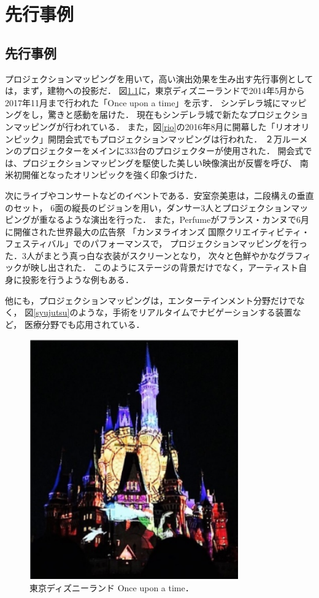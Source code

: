 \chapter{先行事例}
\thispagestyle{fancy}

\section{先行事例}
プロジェクションマッピングを用いて，高い演出効果を生み出す先行事例としては，まず，建物への投影だ．
図\ref{disney}に，東京ディズニーランドで2014年5月から2017年11月まで行われた「Once upon a time」を示す．
シンデレラ城にマッピングをし，驚きと感動を届けた．
現在もシンデレラ城で新たなプロジェクションマッピングが行われている\cite{once}．
また，図\ref{rio}の2016年8月に開幕した「リオオリンピック」開閉会式でもプロジェクションマッピングは行われた． 
２万ルーメンのプロジェクターをメインに333台のプロジェクターが使用された．
開会式では、プロジェクションマッピングを駆使した美しい映像演出が反響を呼び、
南米初開催となったオリンピックを強く印象づけた\cite{olympic}．

次にライブやコンサートなどのイベントである．安室奈美恵は，二段構えの垂直のセット，
6面の縦長のビジョンを用い，ダンサー3人とプロジェクションマッピングが重なるような演出を行った\cite{amuro}．
また，Perfumeがフランス・カンヌで6月に開催された世界最大の広告祭
「カンヌライオンズ 国際クリエイティビティ・フェスティバル」でのパフォーマンスで，
プロジェクションマッピングを行った．3人がまとう真っ白な衣装がスクリーンとなり，
次々と色鮮やかなグラフィックが映し出された\cite{kirameku}．
このようにステージの背景だけでなく，アーティスト自身に投影を行うような例もある．

他にも，プロジェクションマッピングは，エンターテインメント分野だけでなく，
図\ref{syujutsu}のような，手術をリアルタイムでナビゲーションする装置\cite{iryou}など，
医療分野でも応用されている．


\clearpage

\begin{figure}[t]
  \centering
  \includegraphics[width=9cm]{image/disney.png}
  \caption[東京ディズニーランド Once upon a time]{東京ディズニーランド Once upon a time．}
\label{disney}
\end{figure}

